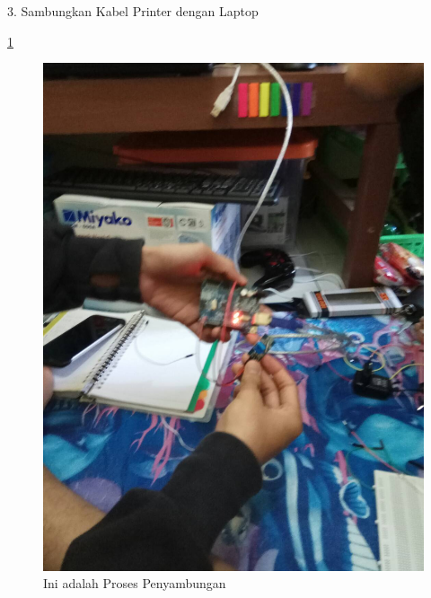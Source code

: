 \documentclass{article}
\begin{document}
 3. Sambungkan Kabel Printer dengan Laptop

  \ref{ar7}
  \begin{figure}[ht]
  \centerline{\includegraphics[width=1\textwidth]{../figures/ar7.jpg}}
  \caption{Ini adalah Proses Penyambungan}
  \label{ar7}
  \end{figure}
\end{document}
